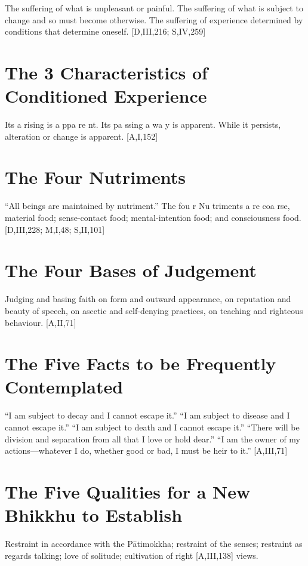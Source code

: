 The suffering of what is unpleasant or painful.
The suffering of what is subject to change and
so must become otherwise.
The suffering of experience determined by
conditions that determine oneself.
[D,III,216; S,IV,259]

\section{The 3 Characteristics of Conditioned Experience}

Its a rising is a ppa re nt. Its pa ssing a wa y is
apparent. While it persists, alteration or
change is apparent.
[A,I,152]

\section{The Four Nutriments}

“All beings are maintained by nutriment.” The
fou r Nu triments a re coa rse, material food;
sense-contact food; mental-intention food;
and consciousness food. [D,III,228; M,I,48; S,II,101]

\section{The Four Bases of Judgement}

Judging and basing faith on form and outward
appearance, on reputation and beauty of
speech, on ascetic and self-denying practices,
on teaching and righteous behaviour. [A,II,71]

\section{The Five Facts to be Frequently Contemplated}

“I am subject to decay and I cannot escape it.”
“I am subject to disease and I cannot escape it.”
“I am subject to death and I cannot escape it.”
“There will be division and separation from
all that I love or hold dear.”
“I am the owner of my actions—whatever I do,
whether good or bad, I must be heir to it.”
[A,III,71]

\section{The Five Qualities for a New Bhikkhu to Establish}

Restraint in accordance with the Pātimokkha;
restraint of the senses; restraint as regards
talking; love of solitude; cultivation of right
[A,III,138]
views.

